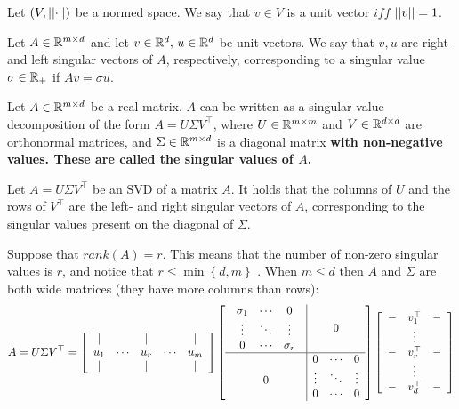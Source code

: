 \begin{definition}
Let $\left(V,\left|\left| \cdot\right|\right|\right)$ be a normed space. We say that $v\in V$ is a unit vector $iff$ $\left|\left| v\right|\right|=1$.
\end{definition}
\begin{definition}
Let $A\in\mathbb{R}^{m\times d}$ and let $v\in\mathbb{R}^d,\, u\in\mathbb{R}^d$ be unit vectors. We say that $v,u$ are right- and left singular vectors of $A$, respectively, corresponding to a singular value $\sigma\in\mathbb{R}_{+}$ if $Av=\sigma u$.
\end{definition}

\begin{theorem}
Let $A\in\mathbb{R}^{m\times d}$ be a real matrix. $A$ can be written as a singular value decomposition of the form $A=U\Sigma V^{\top}$, where $U\in \mathbb{R}^{m\times m}$ and $V\in\mathbb{R}^{d\times d}$ are orthonormal  matrices, and $\Sigma\in \mathbb{R}^{m\times d}$ is a diagonal matrix \bf{with non-negative values}. These are called the \textbf{singular values} of $A$.
\end{theorem}
\begin{claim}
Let $A=U\Sigma V^\top$ be an SVD of a matrix $A$. It holds that the columns of $U$ and the rows of $V^\top$ are the left- and right singular vectors of $A$, corresponding to the singular values present on the diagonal of $\Sigma$.
\end{claim}

Suppose that $rank\left(A\right)=r$. This means that the number of non-zero singular values is $r$, and notice that $r\le\min\left\{ d,m\right\}$ . When $m\le d$ then $A$ and $\Sigma$ are both wide matrices (they have more columns than rows):
$$
A=U\Sigma V^{\top}=\left[\begin{array}{ccccc}
| &  & | &  & |\\
u_{1} & \cdots & u_{r} & \cdots & u_{m}\\
| &  & | &  & |
\end{array}\right]\left[\begin{array}{c|ccc}
\begin{array}{ccc}
\sigma_{1} & \cdots & 0\\
\vdots & \ddots & \vdots\\
0 & \cdots & \sigma_{r}
\end{array} &  & 0\\
\hline  & 0 & \cdots & 0\\
0 & \vdots & \ddots & \vdots\\
& 0 & \cdots & 0
\end{array}\right]\left[\begin{array}{ccc}
- & v_{1}^{\top} & -\\
& \vdots\\
- & v_{r}^{\top} & -\\
& \vdots\\
- & v_{d}^{\top} & -
\end{array}\right]
$$

